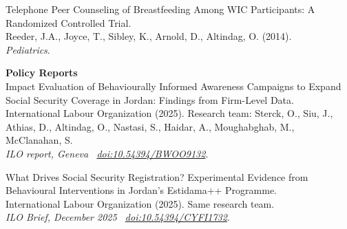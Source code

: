 \documentclass[12pt]{article}
\newcommand{\papertitle}[1]{#1} %
\begin{document}
\smallskip
\noindent\begin{minipage}{\linewidth}
\papertitle{Telephone Peer Counseling of Breastfeeding Among WIC Participants: A Randomized Controlled Trial.} \\
Reeder, J.A., Joyce, T., Sibley, K., Arnold, D., Altindag, O. (2014). \\
\textit{Pediatrics}.
\end{minipage}

\vspace{0.5em}

\noindent\begin{minipage}{\linewidth}
\textbf{Policy Reports}\\[5pt]
\papertitle{Impact Evaluation of Behaviourally Informed Awareness Campaigns to Expand Social Security Coverage in Jordan: Findings from Firm-Level Data.} \\
International Labour Organization (2025). Research team: Sterck, O., Siu, J., Athias, D., Altindag, O., Nastasi, S., Haidar, A., Moughabghab, M., McClanahan, S. \\
\textit{ILO report, Geneva \textperiodcentered\ \href{https://doi.org/10.54394/BWOO9132}{doi:10.54394/BWOO9132}}.
\end{minipage}

\smallskip
\noindent\begin{minipage}{\linewidth}
\papertitle{What Drives Social Security Registration? Experimental Evidence from Behavioural Interventions in Jordan's Estidama++ Programme.} \\
International Labour Organization (2025). Same research team. \\
\textit{ILO Brief, December 2025 \textperiodcentered\ \href{https://doi.org/10.54394/CYFI1732}{doi:10.54394/CYFI1732}}.
\end{minipage}

\vspace{0.5em}
\end{document}
